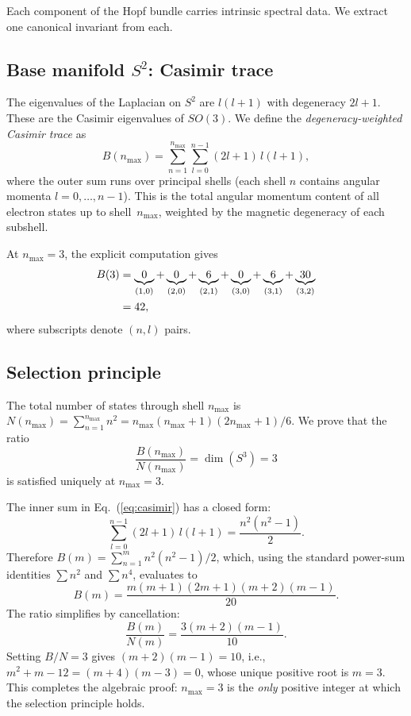 \documentclass[aps,prl,twocolumn,superscriptaddress]{revtex4-2}
\begin{document}
Each component of the Hopf bundle carries intrinsic spectral data. We
extract one canonical invariant from each.

\subsection{Base manifold $S^2$: Casimir trace}

The eigenvalues of the Laplacian on $S^2$ are $l(l+1)$ with
degeneracy $2l+1$. These are the Casimir eigenvalues of $SO(3)$. We
define the \textit{degeneracy-weighted Casimir trace} as
\begin{equation}\label{eq:casimir}
  B(n_{\max}) = \sum_{n=1}^{n_{\max}} \sum_{l=0}^{n-1}
  (2l+1)\,l(l+1),
\end{equation}
where the outer sum runs over principal shells (each shell $n$
contains angular momenta $l = 0, \ldots, n-1$). This is the total
angular momentum content of all electron states up to
shell~$n_{\max}$, weighted by the magnetic degeneracy of each
subshell.

At $n_{\max} = 3$, the explicit computation gives
\begin{align}
  B(3) &= \underbrace{0}_{(1,0)}
         + \underbrace{0}_{(2,0)} + \underbrace{6}_{(2,1)}
         + \underbrace{0}_{(3,0)} + \underbrace{6}_{(3,1)}
         + \underbrace{30}_{(3,2)} \notag \\
       &= 42,
\end{align}
where subscripts denote $(n, l)$ pairs.


\subsection{Selection principle}

The total number of states through shell $n_{\max}$ is
$N(n_{\max}) = \sum_{n=1}^{n_{\max}} n^2 = n_{\max}(n_{\max}+1)(2n_{\max}+1)/6$.
We prove that the ratio
\begin{equation}\label{eq:selection}
  \frac{B(n_{\max})}{N(n_{\max})} = \dim(S^3) = 3
\end{equation}
is satisfied uniquely at $n_{\max} = 3$.

The inner sum in Eq.~(\ref{eq:casimir}) has a closed form:
\begin{equation}\label{eq:innersum}
  \sum_{l=0}^{n-1}(2l+1)\,l(l+1) = \frac{n^2(n^2-1)}{2}.
\end{equation}
Therefore $B(m) = \sum_{n=1}^{m} n^2(n^2-1)/2$, which, using the
standard power-sum identities $\sum n^2$ and $\sum n^4$, evaluates to
\begin{equation}\label{eq:Bclosed}
  B(m) = \frac{m(m+1)(2m+1)(m+2)(m-1)}{20}.
\end{equation}
The ratio simplifies by cancellation:
\begin{equation}\label{eq:ratioclosed}
  \frac{B(m)}{N(m)} = \frac{3(m+2)(m-1)}{10}.
\end{equation}
Setting $B/N = 3$ gives $(m+2)(m-1) = 10$, i.e.,
$m^2 + m - 12 = (m+4)(m-3) = 0$,
whose unique positive root is $m = 3$. This completes the algebraic
proof: $n_{\max} = 3$ is the \textit{only} positive integer at which
the selection principle holds.
\end{document}
